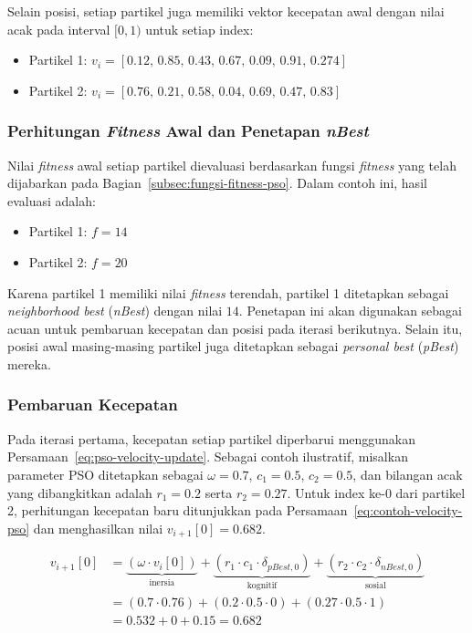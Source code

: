 Selain posisi, setiap partikel juga memiliki vektor kecepatan awal dengan nilai acak pada interval $[0, 1)$ untuk setiap index:

\begin{itemize}
	\item Partikel 1: $v_i = [0.12,\, 0.85,\, 0.43,\, 0.67,\, 0.09,\, 0.91,\, 0.274]$
	\item Partikel 2: $v_i = [0.76,\, 0.21,\, 0.58,\, 0.04,\, 0.69,\, 0.47,\, 0.83]$
\end{itemize}

\subsubsection{Perhitungan \textit{Fitness} Awal dan Penetapan \textit{nBest}}

Nilai \textit{fitness} awal setiap partikel dievaluasi berdasarkan fungsi \textit{fitness} yang telah dijabarkan pada Bagian~\ref{subsec:fungsi-fitness-pso}. Dalam contoh ini, hasil evaluasi adalah:

\begin{itemize}
	\item Partikel 1: $f = 14$
	\item Partikel 2: $f = 20$
\end{itemize}

Karena partikel 1 memiliki nilai \textit{fitness} terendah, partikel 1 ditetapkan sebagai \textit{neighborhood best} (\textit{nBest}) dengan nilai $14$. Penetapan ini akan digunakan sebagai acuan untuk pembaruan kecepatan dan posisi pada iterasi berikutnya. Selain itu, posisi awal masing-masing partikel juga ditetapkan sebagai \textit{personal best} (\textit{pBest}) mereka.

\subsubsection{Pembaruan Kecepatan}

Pada iterasi pertama, kecepatan setiap partikel diperbarui menggunakan Persamaan~\ref{eq:pso-velocity-update}. Sebagai contoh ilustratif, misalkan parameter PSO ditetapkan sebagai $\omega = 0.7$, $c_1 = 0.5$, $c_2 = 0.5$, dan bilangan acak yang dibangkitkan adalah $r_1 = 0.2$ serta $r_2 = 0.27$. Untuk index ke-0 dari partikel 2, perhitungan kecepatan baru ditunjukkan pada Persamaan~\ref{eq:contoh-velocity-pso} dan menghasilkan nilai $v_{i+1}[0] = 0.682$.

\begin{equation}
	\begin{aligned}
		v_{i+1}[0] &= \underbrace{(\omega \cdot v_i[0])}_{\text{inersia}} + \underbrace{(r_1 \cdot c_1 \cdot \delta_{pBest,0})}_{\text{kognitif}} + \underbrace{(r_2 \cdot c_2 \cdot \delta_{nBest,0})}_{\text{sosial}} \\
		&= (0.7 \cdot 0.76) + (0.2 \cdot 0.5 \cdot 0) + (0.27 \cdot 0.5 \cdot 1) \\
		&= 0.532 + 0 + 0.15 = 0.682
	\end{aligned}
	\label{eq:contoh-velocity-pso}
\end{equation}

